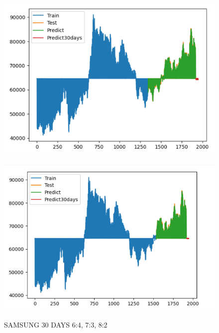 \documentclass{article}
\begin{document}
\begin{multicols}{2}
\begin{figure}[H]
\begin{minipage}{0.15\textwidth}
    \label{fig:1}
    \end{minipage}%
    \begin{minipage}{0.15\textwidth}
    \centering
    \includegraphics[width=1\textwidth]{Image/GradientBoosting/SAMSUNG_30_7_3_GradientBoostingRegressor.png}
  
    \label{fig:2}
    \end{minipage}%
    \begin{minipage}{0.15\textwidth}
    \centering
    \includegraphics[width=1\textwidth]{Image/GradientBoosting/SAMSUNG_30_8_2_GradientBoostingRegressor.png}

    \label{fig:3}
    \end{minipage}
    \caption{SAMSUNG 30 DAYS  6:4, 7:3, 8:2 }
\end{figure}


\end{multicols}
\end{document}
